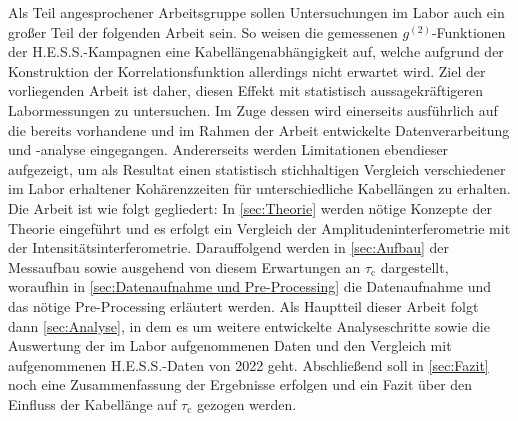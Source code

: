 Als Teil angesprochener Arbeitsgruppe sollen Untersuchungen im Labor auch ein großer Teil der folgenden Arbeit sein. 
So weisen die gemessenen $g^{(2)}$-Funktionen der H.E.S.S.-Kampagnen eine Kabellängenabhängigkeit auf, welche aufgrund der Konstruktion der Korrelationsfunktion allerdings nicht erwartet wird. 
Ziel der vorliegenden Arbeit ist daher, diesen Effekt mit statistisch aussagekräftigeren Labormessungen zu untersuchen. 
Im Zuge dessen wird einerseits ausführlich auf die bereits vorhandene und im Rahmen der Arbeit entwickelte Datenverarbeitung und -analyse eingegangen. 
Andererseits werden Limitationen ebendieser aufgezeigt, um als Resultat einen statistisch stichhaltigen Vergleich verschiedener im Labor erhaltener Kohärenzzeiten für unterschiedliche Kabellängen zu erhalten. \\
Die Arbeit ist wie folgt gegliedert: 
In \autoref{sec:Theorie} werden nötige Konzepte der Theorie eingeführt und es erfolgt ein Vergleich der Amplitudeninterferometrie mit der Intensitätsinterferometrie. 
Darauffolgend werden in \autoref{sec:Aufbau} der Messaufbau sowie ausgehend von diesem Erwartungen an $\tau_{\mathrm{c}}$ dargestellt, woraufhin in \autoref{sec:Datenaufnahme und Pre-Processing} die Datenaufnahme und das nötige Pre-Processing erläutert werden. 
Als Hauptteil dieser Arbeit folgt dann \autoref{sec:Analyse}, in dem es um weitere entwickelte Analyseschritte sowie die Auswertung der im Labor aufgenommenen Daten und den Vergleich mit aufgenommenen H.E.S.S.-Daten von 2022 geht. 
Abschließend soll in \autoref{sec:Fazit} noch eine Zusammenfassung der Ergebnisse erfolgen und ein Fazit über den Einfluss der Kabellänge auf $\tau_{\mathrm{c}}$ gezogen werden.